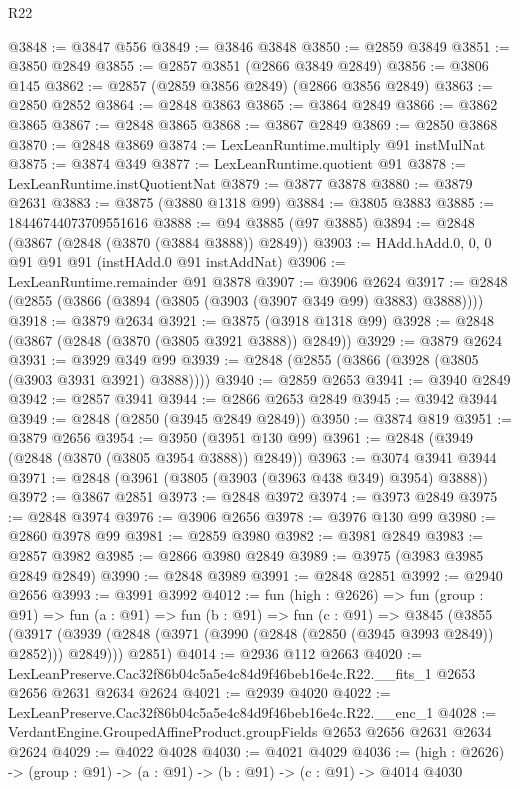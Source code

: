 \begin{lexlean}{R22}
\begin{coremodule}
@3848 := @3847 @556
@3849 := @3846 @3848
@3850 := @2859 @3849
@3851 := @3850 @2849
@3855 := @2857 @3851 (@2866 @3849 @2849)
@3856 := @3806 @145
@3862 := @2857 (@2859 @3856 @2849) (@2866 @3856 @2849)
@3863 := @2850 @2852
@3864 := @2848 @3863
@3865 := @3864 @2849
@3866 := @3862 @3865
@3867 := @2848 @3865
@3868 := @3867 @2849
@3869 := @2850 @3868
@3870 := @2848 @3869
@3874 := LexLeanRuntime.multiply @91 instMulNat
@3875 := @3874 @349
@3877 := LexLeanRuntime.quotient @91
@3878 := LexLeanRuntime.instQuotientNat
@3879 := @3877 @3878
@3880 := @3879 @2631
@3883 := @3875 (@3880 @1318 @99)
@3884 := @3805 @3883
@3885 := 18446744073709551616
@3888 := @94 @3885 (@97 @3885)
@3894 := @2848 (@3867 (@2848 (@3870 (@3884 @3888)) @2849))
@3903 := HAdd.hAdd.{0, 0, 0} @91 @91 @91 (instHAdd.{0} @91 instAddNat)
@3906 := LexLeanRuntime.remainder @91 @3878
@3907 := @3906 @2624
@3917 := @2848 (@2855 (@3866 (@3894 (@3805 (@3903 (@3907 @349 @99) @3883) @3888))))
@3918 := @3879 @2634
@3921 := @3875 (@3918 @1318 @99)
@3928 := @2848 (@3867 (@2848 (@3870 (@3805 @3921 @3888)) @2849))
@3929 := @3879 @2624
@3931 := @3929 @349 @99
@3939 := @2848 (@2855 (@3866 (@3928 (@3805 (@3903 @3931 @3921) @3888))))
@3940 := @2859 @2653
@3941 := @3940 @2849
@3942 := @2857 @3941
@3944 := @2866 @2653 @2849
@3945 := @3942 @3944
@3949 := @2848 (@2850 (@3945 @2849 @2849))
@3950 := @3874 @819
@3951 := @3879 @2656
@3954 := @3950 (@3951 @130 @99)
@3961 := @2848 (@3949 (@2848 (@3870 (@3805 @3954 @3888)) @2849))
@3963 := @3074 @3941 @3944
@3971 := @2848 (@3961 (@3805 (@3903 (@3963 @438 @349) @3954) @3888))
@3972 := @3867 @2851
@3973 := @2848 @3972
@3974 := @3973 @2849
@3975 := @2848 @3974
@3976 := @3906 @2656
@3978 := @3976 @130 @99
@3980 := @2860 @3978 @99
@3981 := @2859 @3980
@3982 := @3981 @2849
@3983 := @2857 @3982
@3985 := @2866 @3980 @2849
@3989 := @3975 (@3983 @3985 @2849 @2849)
@3990 := @2848 @3989
@3991 := @2848 @2851
@3992 := @2940 @2656
@3993 := @3991 @3992
@4012 := fun (high : @2626) =>
  fun (group : @91) =>
  fun (a : @91) =>
  fun (b : @91) =>
  fun (c : @91) =>
  @3845
    (@3855
      (@3917 (@3939 (@2848 (@3971 (@3990 (@2848 (@2850 (@3945 @3993 @2849)) @2852))) @2849)))
      @2851)
@4014 := @2936 @112 @2663
@4020 := LexLeanPreserve.Cac32f86b04c5a5e4c84d9f46beb16e4c.R22.__fits_1
    @2653
    @2656
    @2631
    @2634
    @2624
@4021 := @2939 @4020
@4022 := LexLeanPreserve.Cac32f86b04c5a5e4c84d9f46beb16e4c.R22.__enc_1
@4028 := VerdantEngine.GroupedAffineProduct.groupFields @2653 @2656 @2631 @2634 @2624
@4029 := @4022 @4028
@4030 := @4021 @4029
@4036 := (high : @2626) -> (group : @91) -> (a : @91) -> (b : @91) -> (c : @91) -> @4014 @4030

\end{coremodule}
\end{lexlean}
